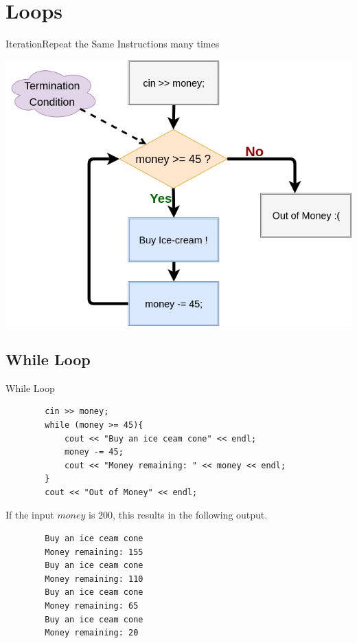 \section{Loops}

\begin{frame}[fragile]{Iteration}{Repeat the Same Instructions many times}
    \begin{center}
        \includegraphics[width=0.75\linewidth]{images/while_flow.png}
    \end{center}
\end{frame}

\subsection{While Loop}
\begin{frame}[fragile]{While Loop}{}
    \begin{verbatim}
        cin >> money;
        while (money >= 45){
            cout << "Buy an ice ceam cone" << endl;
            money -= 45;
            cout << "Money remaining: " << money << endl;
        }
        cout << "Out of Money" << endl;
    \end{verbatim}
     \pause
   \begin{block}{If the input $money$ is 200, this results in the following output.}
        \begin{verbatim}
        Buy an ice ceam cone
        Money remaining: 155
        Buy an ice ceam cone
        Money remaining: 110
        Buy an ice ceam cone
        Money remaining: 65 
        Buy an ice ceam cone
        Money remaining: 20 
        \end{verbatim}
    \end{block}
\end{frame}

